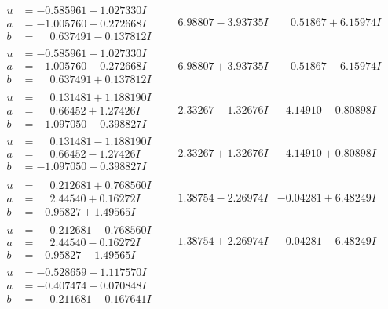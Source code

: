 \documentclass[1p]{elsarticle_modified}
\theoremstyle{definition}
\begin{document}
$$\begin{array}{c|c|c}
\begin{aligned}
u &= -0.585961 + 1.027330 I \\
a &= -1.005760 - 0.272668 I \\
b &= \phantom{-}0.637491 - 0.137812 I\end{aligned}
 & \phantom{-}6.98807 - 3.93735 I & \phantom{-}0.51867 + 6.15974 I \\ \hline\begin{aligned}
u &= -0.585961 - 1.027330 I \\
a &= -1.005760 + 0.272668 I \\
b &= \phantom{-}0.637491 + 0.137812 I\end{aligned}
 & \phantom{-}6.98807 + 3.93735 I & \phantom{-}0.51867 - 6.15974 I \\ \hline\begin{aligned}
u &= \phantom{-}0.131481 + 1.188190 I \\
a &= \phantom{-}0.66452 + 1.27426 I \\
b &= -1.097050 - 0.398827 I\end{aligned}
 & \phantom{-}2.33267 - 1.32676 I & -4.14910 - 0.80898 I \\ \hline\begin{aligned}
u &= \phantom{-}0.131481 - 1.188190 I \\
a &= \phantom{-}0.66452 - 1.27426 I \\
b &= -1.097050 + 0.398827 I\end{aligned}
 & \phantom{-}2.33267 + 1.32676 I & -4.14910 + 0.80898 I \\ \hline\begin{aligned}
u &= \phantom{-}0.212681 + 0.768560 I \\
a &= \phantom{-}2.44540 + 0.16272 I \\
b &= -0.95827 + 1.49565 I\end{aligned}
 & \phantom{-}1.38754 - 2.26974 I & -0.04281 + 6.48249 I \\ \hline\begin{aligned}
u &= \phantom{-}0.212681 - 0.768560 I \\
a &= \phantom{-}2.44540 - 0.16272 I \\
b &= -0.95827 - 1.49565 I\end{aligned}
 & \phantom{-}1.38754 + 2.26974 I & -0.04281 - 6.48249 I \\ \hline\begin{aligned}
u &= -0.528659 + 1.117570 I \\
a &= -0.407474 + 0.070848 I \\
b &= \phantom{-}0.211681 - 0.167641 I\end{aligned}

\end{array}$$
\end{document}
